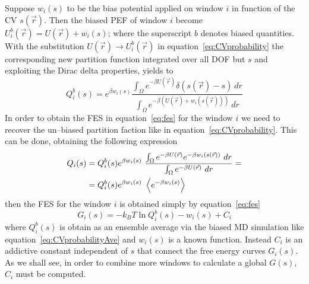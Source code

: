 Suppose $w_i(s)$ to be the bias potential applied on window $i$ in function of the \ac{CV} $s(\vec r)$. Then the biased \ac{PEF} of window $i$ become $U_i^b(\vec r) = U(\vec r) + w_i(s)$; where the superscript $b$ denotes biased quantities. With the substitution $U(\vec r) \rightarrow U_i^b(\vec r)$ in equation~\eqref{eq:CVprobability} the corresponding new partition function integrated over all \ac{DOF} but $s$ and exploiting the Dirac delta properties, yields to
\begin{equation*}
	Q_i^b(s) = e^{\beta w_i(s)}\frac{ \int_\Omega e^{-\beta U(\vec r)}\delta(s(\vec r) - s)\ dr }{\int_\Omega e^{-\beta (U(\vec r) + w_i(s(\vec r)))}\ dr}
\end{equation*}
In order to obtain the \ac{FES} in equation~\eqref{eq:fes} for the window $i$ we need to recover the un--biased partition faction like in equation~\eqref{eq:CVprobability}. This can be done, obtaining the following expression
\begin{equation}
	\begin{aligned}
	Q_i(s) &= Q_i^b(s) e^{\beta w_i(s)}\ \frac{ \int_\Omega e^{-\beta U(\vec r)}e^{-\beta w_i(s(\vec r))}\ dr }{\int_\Omega e^{-\beta U(\vec r)}\ dr} = \\
		   &= Q_i^b(s) e^{\beta w_i(s)}\ \left \langle e^{-\beta w_i(s)} \right \rangle
	\end{aligned}
	\label{eq:windowPartFunc}
\end{equation}
then the \ac{FES} for the window $i$ is obtained simply by equation~\eqref{eq:fes}
\begin{equation*}
	G_i(s) = -k_BT \ln Q_i^b(s) - w_i(s) + C_i
\end{equation*}
where $Q_i^b(s)$ is obtain as an ensemble average via the biased \ac{MD} simulation like equation~\eqref{eq:CVprobabilityAve} and $w_i(s)$ is a known function. Instead $C_i$ is an addictive constant independent of $s$ that connect the free energy curves $G_i(s)$. As we shall see, in order to combine more windows to calculate a global $G(s)$, $C_i$ must be computed.


